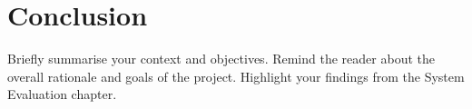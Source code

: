 \chapter{Conclusion}
Briefly summarise your context and objectives. Remind the reader about the overall rationale and goals of the project. Highlight your findings from the System Evaluation chapter.